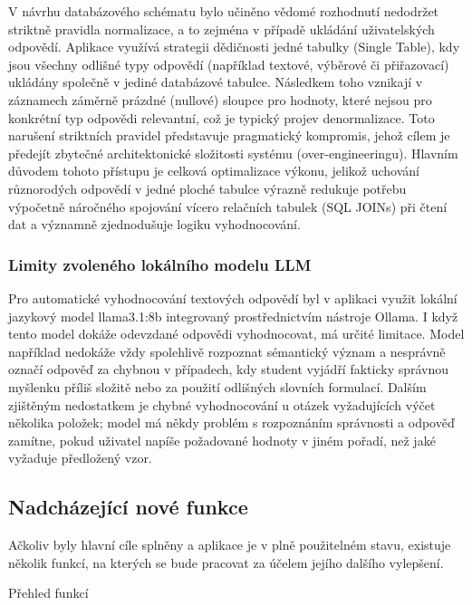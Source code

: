 \documentclass{vskpou} %
\begin{document}
V návrhu databázového schématu bylo učiněno vědomé rozhodnutí nedodržet striktně pravidla normalizace, a to zejména v případě ukládání uživatelských odpovědí. Aplikace využívá strategii dědičnosti jedné tabulky (Single Table), kdy jsou všechny odlišné typy odpovědí (například textové, výběrové či přiřazovací) ukládány společně v jediné databázové tabulce. Následkem toho vznikají v záznamech záměrně prázdné (nullové) sloupce pro hodnoty, které nejsou pro konkrétní typ odpovědi relevantní, což je typický projev denormalizace. Toto narušení striktních pravidel představuje pragmatický kompromis, jehož cílem je předejít zbytečné architektonické složitosti systému (over-engineeringu). Hlavním důvodem tohoto přístupu je celková optimalizace výkonu, jelikož uchování různorodých odpovědí v jedné ploché tabulce výrazně redukuje potřebu výpočetně náročného spojování vícero relačních tabulek (SQL JOINs) při čtení dat a významně zjednodušuje logiku vyhodnocování.

\subsubsection{Limity zvoleného lokálního modelu LLM}

Pro automatické vyhodnocování textových odpovědí byl v aplikaci využit lokální jazykový model llama3.1:8b integrovaný prostřednictvím nástroje Ollama. I když tento model dokáže odevzdané odpovědi vyhodnocovat, má určité limitace. Model například nedokáže vždy spolehlivě rozpoznat sémantický význam a nesprávně označí odpověď za chybnou v případech, kdy student vyjádří fakticky správnou myšlenku příliš složitě nebo za použití odlišných slovních formulací. Dalším zjištěným nedostatkem je chybné vyhodnocování u otázek vyžadujících výčet několika položek; model má někdy problém s rozpoznáním správnosti a odpověď zamítne, pokud uživatel napíše požadované hodnoty v jiném pořadí, než jaké vyžaduje předložený vzor.

\subsection{Nadcházející nové funkce}

Ačkoliv byly hlavní cíle splněny a aplikace je v plně použitelném stavu, existuje několik funkcí, na kterých se bude pracovat za účelem jejího dalšího vylepšení.

Přehled funkcí
\end{document}
